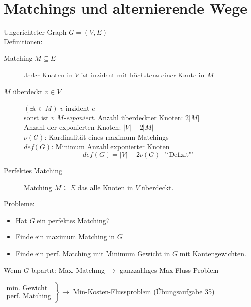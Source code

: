 
\section{Matchings und alternierende Wege}


Ungerichteter Graph $G=(V,E)$\\
Definitionen:
\begin{description}
\item[Matching $M \subseteq E$] Jeder Knoten in $V$ ist inzident mit
höchstens einer Kante in $M$.
\item[$M$ überdeckt $v\in V$]
$(\exists e \in M) \; v$ inzident $e$\\
sonst ist $v$ {\em $M$-exponiert}.
Anzahl überdeckter Knoten: $2|M|$\\
Anzahl der exponierten Knoten: $|V| - 2|M|$\\
$\nu(G)$: Kardinalität eines maximum Matchings\\
$def(G)$: Minimum Anzahl exponierter Knoten
\[def(G) = |V| - 2 \nu(G) \; \; \mbox{"`Defizit"'}\]
\item[Perfektes Matching] Matching $M \subseteq E$ das alle Knoten in $V$
überdeckt.
\end{description}

Probleme:
\begin{itemize}
\item Hat $G$ ein perfektes Matching?
\item Finde ein maximum Matching in $G$
\item Finde ein perf. Matching mit Minimum Gewicht in $G$ mit
Kantengewichten.
\end{itemize}

Wenn $G$ bipartit: Max. Matching $\rightarrow$ ganzzahliges
Max-Fluss-Problem

$\left.\begin{array}{l}\mbox{min. Gewicht}\\\mbox{perf. Matching}\end{array}
\right\} \rightarrow$ Min-Kosten-Flussproblem (Übungsaufgabe 35)


